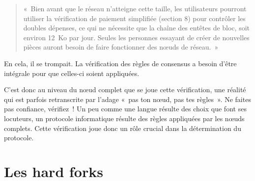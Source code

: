 \begin{quote}
«~Bien avant que le réseau n'atteigne cette taille, les utilisateurs pourront utiliser la vérification de paiement simplifiée (section 8) pour contrôler les doubles dépenses, ce qui ne nécessite que la chaîne des entêtes de bloc, soit environ 12~Ko par jour. Seules les personnes essayant de créer de nouvelles pièces auront besoin de faire fonctionner des nœuds de réseau.~»
\end{quote} %

En cela, il se trompait. La vérification des règles de consensus a besoin d'être intégrale pour que celles-ci soient appliquées.

C'est donc au niveau du nœud complet que se joue cette vérification, une réalité qui est parfois retranscrite par l'adage «~pas ton nœud, pas tes règles~». Ne faites pas confiance, vérifiez~! Un peu comme une langue résulte des choix que font ses locuteurs, un protocole informatique résulte des règles appliquées par les nœuds complets. Cette vérification joue donc un rôle crucial dans la détermination du protocole.

\section*{Les hard forks}

